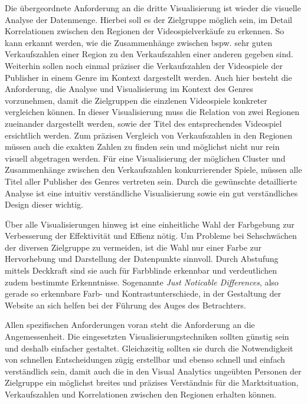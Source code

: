 \documentclass[usegeometry=true]{scrartcl}
\begin{document}
Die übergeordnete Anforderung an die dritte Visualisierung ist wieder die visuelle Analyse der Datenmenge. 
Hierbei soll es der Zielgruppe möglich sein, im Detail Korrelationen zwischen den Regionen der Videospielverkäufe zu erkennen. 
So kann erkannt werden, wie die Zusammenhänge zwischen bspw. sehr guten Verkaufszahlen einer Region zu den Verkaufszahlen einer anderen gegeben sind. 
Weiterhin sollen noch einmal präziser die Verkaufszahlen der Videospiele der Publisher in einem Genre im Kontext dargestellt werden. 
Auch hier besteht die Anforderung, die Analyse und Visualisierung im Kontext des Genres vorzunehmen, damit die Zielgruppen die einzlenen Videospiele konkreter vergleichen können.
In dieser Visualisierung muss die Relation von zwei Regionen zueinander dargestellt werden, sowie der Titel des entsprechendes Videospiel ersichtlich werden. 
Zum präzisen Vergleich von Verkaufszahlen in den Regionen müssen auch die exakten Zahlen zu finden sein und möglichst nicht nur rein visuell abgetragen werden. 
Für eine Visualisierung der möglichen Cluster und Zusammenhänge zwischen den Verkaufszahlen konkurrierender Spiele, müssen alle Titel aller Publisher des Genres vertreten sein.
Durch die gewünschte detaillierte Analyse ist eine intuitiv verständliche Visualisierung sowie ein gut verständliches Design dieser wichtig. 

Über alle Visualisierungen hinweg ist eine einheitliche Wahl der Farbgebung zur Verbesserung der Effektivität und Effienz nötig. 
Um Probleme bei Sehschwächen der diversen Zielgruppe zu vermeiden, ist die Wahl nur einer Farbe zur Hervorhebung und Darstellung der Datenpunkte sinnvoll. 
Durch Abstufung mittels Deckkraft sind sie auch für Farbblinde erkennbar und verdeutlichen zudem bestimmte Erkenntnisse.
Sogenannte \textit{Just Noticable Differences}, also gerade so erkennbare Farb- und Kontrastunterschiede, in der Gestaltung der Website an sich helfen bei der Führung des Auges des Betrachters.

Allen spezifischen Anforderungen voran steht die Anforderung an die Angemessenheit. 
Die eingesetzten Visualisierungstechniken sollten günstig sein und deshalb einfacher gestaltet. 
Gleichzeitig sollten sie durch die Notwendigkeit von schnellen Entscheidungen zügig erstellbar und ebenso schnell und einfach verständlich sein, damit auch die in den Visual Analytics ungeübten Personen der Zielgruppe ein möglichst breites und präzises Verständnis für die Marktsituation, Verkaufszahlen und Korrelationen zwischen den Regionen erhalten können.
\end{document}
